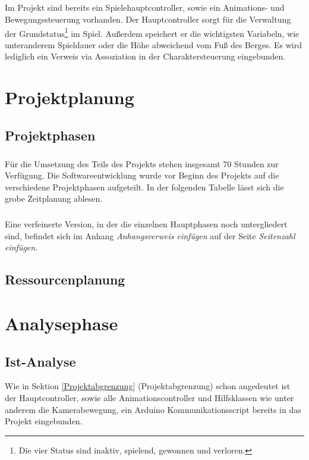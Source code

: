 \paragraph{}
Im Projekt sind bereits ein Spielehauptcontroller, sowie ein Animations- und Bewegungssteuerung vorhanden.
Der Hauptcontroller sorgt für die Verwaltung der Grundstatus\footnote{Die vier Status sind inaktiv, spielend, gewonnen und verloren.} im Spiel. Außerdem speichert er die wichtigsten Variabeln, wie unteranderem Spieldauer oder die Höhe abweichend vom Fuß des Berges. Es wird lediglich ein Verweis via Assoziation in der Charaktersteuerung eingebunden.

\chapter{Projektplanung}
\section{Projektphasen}
\paragraph{}
Für die Umsetzung des Teils des Projekts stehen insgesamt 70 Stunden zur Verfügung. Die Softwareentwicklung wurde vor Beginn des Projekts auf die verschiedene Projektphasen aufgeteilt. In der folgenden Tabelle  lässt sich die grobe Zeitplanung ablesen.\\

\paragraph{}
Eine verfeinerte Version, in der die einzelnen Hauptphasen noch untergliedert sind, befindet sich im Anhang \textit{Anhangsverweis einfügen} auf der Seite \textit{Seitenzahl einfügen}.

\section{Ressourcenplanung}

\chapter{Analysephase}
\section{Ist-Analyse}
Wie in Sektion \ref{Projektabgrenzung} (Projektabgrenzung) schon angedeutet ist der Hauptcontroller, sowie alle Animationscontroller und Hilfsklassen wie unter anderem die Kamerabewegung, ein Arduino Kommunikationsscript bereits in das Projekt eingebunden. 

